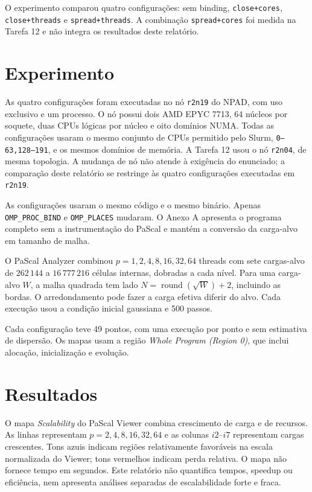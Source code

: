 \documentclass[11pt,letterpaper]{article}
\begin{document}
O experimento comparou quatro configurações: sem binding, \texttt{close+cores}, \texttt{close+threads} e \texttt{spread+threads}. A combinação \texttt{spread+cores} foi medida na Tarefa 12 e não integra os resultados deste relatório.

\section{Experimento}
As quatro configurações foram executadas no nó \texttt{r2n19} do NPAD, com uso exclusivo e um processo. O nó possui dois AMD EPYC 7713, 64 núcleos por soquete, duas CPUs lógicas por núcleo e oito domínios NUMA. Todas as configurações usaram o mesmo conjunto de CPUs permitido pelo Slurm, \texttt{0--63,128--191}, e os mesmos domínios de memória. A Tarefa 12 usou o nó \texttt{r2n04}, de mesma topologia. A mudança de nó não atende à exigência do enunciado; a comparação deste relatório se restringe às quatro configurações executadas em \texttt{r2n19}.

As configurações usaram o mesmo código e o mesmo binário. Apenas \texttt{OMP\_PROC\_BIND} e \texttt{OMP\_PLACES} mudaram. O Anexo A apresenta o programa completo sem a instrumentação do PaScal e mantém a conversão da carga-alvo em tamanho de malha.

O PaScal Analyzer combinou $p=1,2,4,8,16,32,64$ threads com sete cargas-alvo de $262\,144$ a $16\,777\,216$ células internas, dobradas a cada nível. Para uma carga-alvo $W$, a malha quadrada tem lado $N=\operatorname{round}(\sqrt{W})+2$, incluindo as bordas. O arredondamento pode fazer a carga efetiva diferir do alvo. Cada execução usou a condição inicial gaussiana e 500 passos.

Cada configuração teve 49 pontos, com uma execução por ponto e sem estimativa de dispersão. Os mapas usam a região \textit{Whole Program (Region 0)}, que inclui alocação, inicialização e evolução.

\section{Resultados}
O mapa \textit{Scalability} do PaScal Viewer combina crescimento de carga e de recursos. As linhas representam $p=2,4,8,16,32,64$ e as colunas $i2$--$i7$ representam cargas crescentes. Tons azuis indicam regiões relativamente favoráveis na escala normalizada do Viewer; tons vermelhos indicam perda relativa. O mapa não fornece tempo em segundos. Este relatório não quantifica tempos, speedup ou eficiência, nem apresenta análises separadas de escalabilidade forte e fraca.
\end{document}
